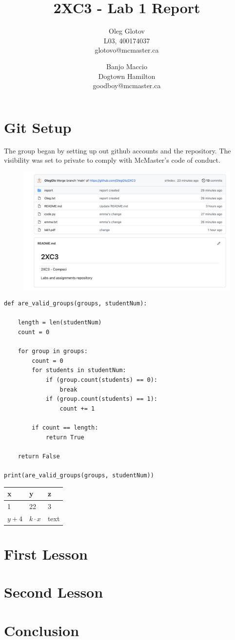 \documentclass[twocolumn, 10pt]{article}
\title{2XC3 - Lab 1 Report}
\author{Oleg Glotov\\ L03, 400174037\\ glotovo@mcmaster.ca \and Banjo Maccio\\ Dogtown Hamilton\\ goodboy@mcmaster.ca}
\begin{document}
\maketitle
\section{Git Setup}\label{sec:git}
The group began by setting up out github accounts and the repository. The visibility was set to private to comply with McMaster's code of conduct.

\begin{figure}[h]
\includegraphics[width=\linewidth]{img1}
\end{figure}

\footnotesize
\begin{verbatim}
def are_valid_groups(groups, studentNum):

    length = len(studentNum)
    count = 0
    
    for group in groups:
        count = 0
        for students in studentNum:
            if (group.count(students) == 0):
                break
            if (group.count(students) == 1):
                count += 1
        
        if count == length:
            return True
        
    return False

print(are_valid_groups(groups, studentNum))
\end{verbatim}
\normalsize

\begin{center}
\begin{table}[!h]
\begin{tabular}{|l|l|l|}
\hline
x     & y          & z    \\ \hline
1     & 22         & 3    \\ \hline
$y+4$ & $k\cdot x$ & text \\ \hline
\end{tabular}
\end{table}
\end{center}

\section{First Lesson}
\section{Second Lesson}
\section{Conclusion}
\end{document}
